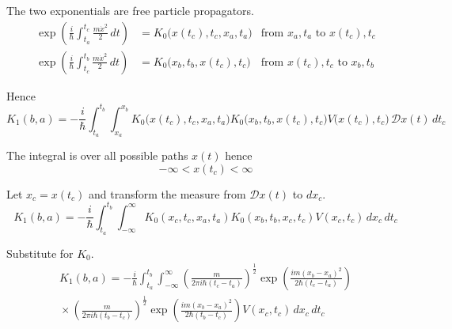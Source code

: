 The two exponentials are free particle propagators.
\begin{align*}
\exp\left(\frac{i}{\hbar}\int_{t_a}^{t_c}\frac{m\dot x^2}{2}\,dt\right)
&=K_0\bigl(x(t_c),t_c,x_a,t_a\bigr)
&\text{from $x_a,t_a$ to $x(t_c),t_c$}
\\
\exp\left(\frac{i}{\hbar}\int_{t_c}^{t_b}\frac{m\dot x^2}{2}\,dt\right)
&=K_0\bigl(x_b,t_b,x(t_c),t_c\bigr)
&\text{from $x(t_c),t_c$ to $x_b,t_b$}
\end{align*}

Hence
\begin{equation*}
K_1(b,a)=-\frac{i}{\hbar}\int_{t_a}^{t_b}\int_{x_a}^{x_b}
K_0\bigl(x(t_c),t_c,x_a,t_a\bigr)K_0\bigl(x_b,t_b,x(t_c),t_c\bigr)
V\bigl(x(t_c),t_c\bigr)
\,\mathscr Dx(t)\,dt_c
\end{equation*}

The integral is over all possible paths $x(t)$ hence
\begin{equation*}
-\infty<x(t_c)<\infty
\end{equation*}

Let $x_c=x(t_c)$ and transform the measure from $\mathscr Dx(t)$ to $dx_c$.
\begin{equation*}
K_1(b,a)=-\frac{i}{\hbar}\int_{t_a}^{t_b}\int_{-\infty}^\infty
K_0(x_c,t_c,x_a,t_a)K_0(x_b,t_b,x_c,t_c)
V(x_c,t_c)
\,dx_c\,dt_c
\end{equation*}

Substitute for $K_0$.
\begin{multline*}
K_1(b,a)=-\frac{i}{\hbar}\int_{t_a}^{t_b}\int_{-\infty}^\infty
\left(\frac{m}{2\pi i\hbar(t_c-t_a)}\right)^\frac{1}{2}
\exp\left(\frac{im(x_b-x_a)^2}{2\hbar(t_c-t_a)}\right)
\\
{}\times
\left(\frac{m}{2\pi i\hbar(t_b-t_c)}\right)^\frac{1}{2}
\exp\left(\frac{im(x_b-x_a)^2}{2\hbar(t_b-t_c)}\right)
V(x_c,t_c)
\,dx_c\,dt_c
\end{multline*}


